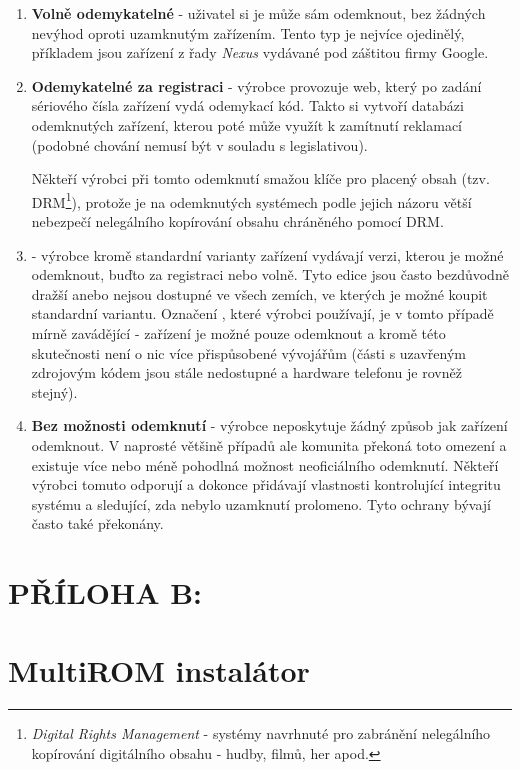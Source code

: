 \documentclass[12pt, a4paper, oneside]{article}
\newcommand{\B}{\textbf} %
\newcommand{\It}{\textit}  %
\begin{document}
\begin{enumerate}
    \item \B{Volně odemykatelné} - uživatel si je může sám odemknout, bez žádných nevýhod oproti uzamknutým zařízením. Tento typ je nejvíce ojedinělý, příkladem jsou zařízení z řady \It{Nexus} vydávané pod záštitou firmy Google.
    
    \item \B{Odemykatelné za registraci} - výrobce provozuje web, který po zadání sériového čísla zařízení vydá odemykací kód. Takto si vytvoří databázi odemknutých zařízení, kterou poté může využít k zamítnutí reklamací (podobné chování nemusí být v souladu s legislativou).
    
    Někteří výrobci při tomto odemknutí smažou klíče pro placený obsah (tzv. DRM\footnote{\It{Digital Rights Management} - systémy navrhnuté pro zabránění nelegálního kopírování digitálního obsahu - hudby, filmů, her apod.}), protože je na odemknutých systémech podle jejich názoru větší nebezpečí nelegálního kopírování obsahu chráněného pomocí DRM.
    
    \item \B{} - výrobce kromě standardní varianty zařízení vydávají verzi, kterou je možné odemknout, buďto za registraci nebo volně. Tyto edice jsou často bezdůvodně dražší anebo nejsou dostupné ve všech zemích, ve kterých je možné koupit standardní variantu. Označení , které výrobci používají, je v tomto případě mírně zavádějící - zařízení je možné pouze odemknout a kromě této skutečnosti není o nic více přispůsobené vývojářům (části s uzavřeným zdrojovým kódem jsou stále nedostupné a hardware telefonu je rovněž stejný).

    \item \B{Bez možnosti odemknutí} - výrobce neposkytuje žádný způsob jak zařízení odemknout. V naprosté většině případů ale komunita překoná toto omezení a existuje více nebo méně pohodlná možnost neoficiálního odemknutí. Někteří výrobci tomuto odporují a dokonce přidávají vlastnosti kontrolující integritu systému a sledující, zda nebylo uzamknutí prolomeno. Tyto ochrany bývají často také překonány.
    
\end{enumerate}

\newpage
\section*{PŘÍLOHA B:}
\section*{MultiROM instalátor}
\label{sec:installer}
\end{document}

